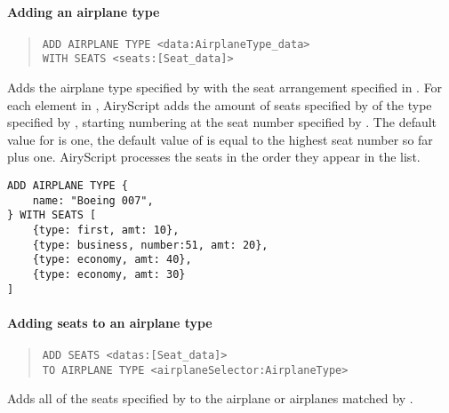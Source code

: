 \paragraph{Adding an airplane type}
\begin{quote}
\begin{lstlisting}
ADD AIRPLANE TYPE <data:AirplaneType_data>
WITH SEATS <seats:[Seat_data]>
\end{lstlisting}
\end{quote}
Adds the airplane type specified by  with the seat arrangement
specified in . For each element in , AiryScript adds
the amount of seats specified by  of the type specified by ,
starting numbering at the seat number specified by .  The default
value for  is one, the default value of  is equal to the
highest seat number so far plus one. AiryScript processes the seats in the order
they appear in the  list.


\begin{texa}
  {
\begin{lstlisting}
ADD AIRPLANE TYPE {
    name: "Boeing 007",
} WITH SEATS [
    {type: first, amt: 10},
    {type: business, number:51, amt: 20},
    {type: economy, amt: 40},
    {type: economy, amt: 30}
]
\end{lstlisting}
  }
\end{texa}

\paragraph{Adding seats to an airplane type}
\begin{quote}
  \begin{lstlisting}
ADD SEATS <datas:[Seat_data]>
TO AIRPLANE TYPE <airplaneSelector:AirplaneType>
  \end{lstlisting}
\end{quote}
Adds all of the seats specified by  to the airplane or airplanes
matched by .

